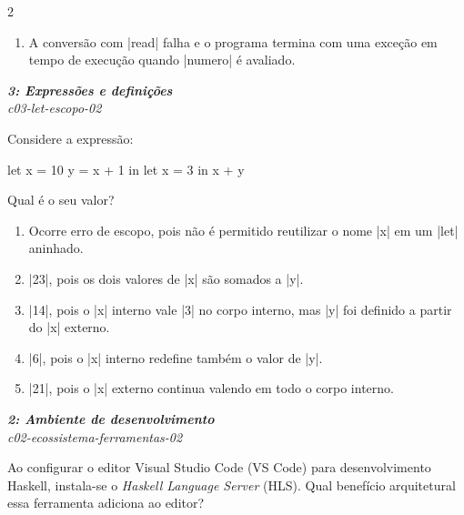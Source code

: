 \documentclass[a4paper,10pt,brazil]{article}
\begin{document}
\begin{multicols}{2}
\begin{enumerate}
  \item A conversão com \haskellinline|read| falha e o programa termina com uma exceção em tempo de execução quando \haskellinline|numero| é avaliado.


\end{enumerate}

\begin{flushright}
  \footnotesize
  \textit{\textbf{3: Expressões e definições}}\\
  \textit{c03-let-escopo-02}\\

\end{flushright}
Considere a expressão:

\begin{haskellcode}
let x = 10
    y = x + 1
in let x = 3
   in x + y
\end{haskellcode}

Qual é o seu valor?

\begin{enumerate}
  \item Ocorre erro de escopo, pois não é permitido reutilizar o nome \haskellinline|x| em um \haskellinline|let| aninhado.

  \item \haskellinline|23|, pois os dois valores de \haskellinline|x| são somados a \haskellinline|y|.

  \item \haskellinline|14|, pois o \haskellinline|x| interno vale \haskellinline|3| no corpo interno, mas \haskellinline|y| foi definido a partir do \haskellinline|x| externo.

  \item \haskellinline|6|, pois o \haskellinline|x| interno redefine também o valor de \haskellinline|y|.

  \item \haskellinline|21|, pois o \haskellinline|x| externo continua valendo em todo o corpo interno.


\end{enumerate}

\begin{flushright}
  \footnotesize
  \textit{\textbf{2: Ambiente de desenvolvimento}}\\
  \textit{c02-ecossistema-ferramentas-02}\\

\end{flushright}
Ao configurar o editor Visual Studio Code (VS Code) para desenvolvimento Haskell, instala-se o \emph{Haskell Language Server} (HLS). Qual benefício arquitetural essa ferramenta adiciona ao editor?


\end{multicols}
\end{document}
